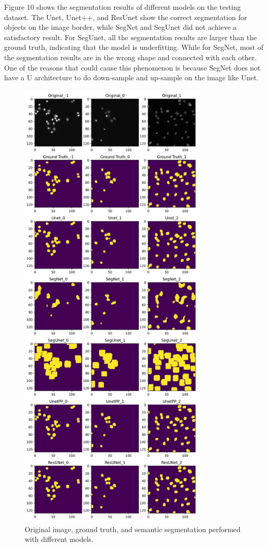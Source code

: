 \documentclass{article}
\begin{document}
Figure 10 shows the segmentation results of different models on the testing dataset. The Unet, Unet++, and ResUnet show the correct segmentation for objects on the image border, while SegNet and SegUnet did not achieve a satisfactory result. For SegUnet, all the segmentation results are larger than the ground truth, indicating that the model is underfitting. While for SegNet, most of the segmentation results are in the wrong shape and connected with each other. One of the reasons that could cause this phenomenon is because SegNet does not have a U architecture to do down-sample and up-sample on the image like Unet.
\begin{figure}[H]
    \centering
    \includegraphics[width=9cm]{SegmentationResults.png}
    \caption{Original image, ground truth, and semantic segmentation performed with different models.}
    \label{2}
\end{figure}
\end{document}
